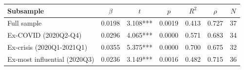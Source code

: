 \begin{tabular}{lcccccc}
\toprule
Subsample & $\beta$ & $t$ & $p$ & $R^2$ & $\rho$ & $N$ \\
\midrule
Full sample & 0.0198 & 3.108*** & 0.0019 & 0.413 & 0.727 & 37 \\
Ex-COVID (2020Q2-Q4) & 0.0296 & 4.065*** & 0.0000 & 0.571 & 0.683 & 34 \\
Ex-crisis (2020Q1-2021Q1) & 0.0355 & 5.375*** & 0.0000 & 0.700 & 0.675 & 32 \\
Ex-most influential (2020Q3) & 0.0236 & 3.149*** & 0.0016 & 0.482 & 0.715 & 36 \\
\bottomrule
\end{tabular}
